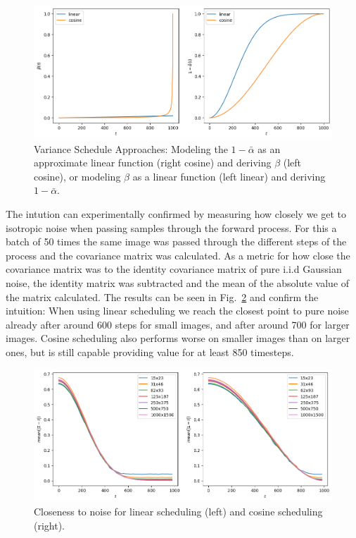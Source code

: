 \begin{figure}[h]
    \centering
    \includegraphics[width=.7\textwidth]{images/variance_schedule_alphadash.png}
    \caption{Variance Schedule Approaches: Modeling the $1-\bar{\alpha}$ as an approximate linear function (right cosine) and deriving $\beta$ (left cosine), or modeling $\beta$ as a linear function (left linear) and deriving $1-\bar{\alpha}$.}
    \label{fig:alphadash}
\end{figure}

The intution can experimentally confirmed by measuring how closely we get to isotropic noise when passing samples through the forward process. For this a batch of 50 times the same image was passed through the different steps of the process and the covariance matrix was calculated. As a metric for how close the covariance matrix was to the identity covariance matrix of pure i.i.d Gaussian noise, the identity matrix was subtracted and the mean of the absolute value of the matrix calculated. The results can be seen in Fig.~\ref{fig:noisecloseness} and confirm the intuition: When using linear scheduling we reach the closest point to pure noise already after around 600 steps for small images, and after around 700 for larger images. Cosine scheduling also performs worse on smaller images than on larger ones, but is still capable providing value for at least 850 timesteps.

\begin{figure}[h]
    \centering
    \includegraphics[width=.7\textwidth]{images/frobenius_norm.png}
    \caption{Closeness to noise for linear scheduling (left) and cosine scheduling (right).}
    \label{fig:noisecloseness}
\end{figure}